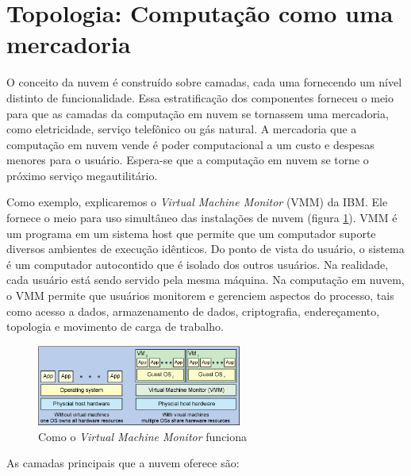 \section{Topologia: Computação como uma mercadoria}

O conceito da nuvem é construído sobre camadas, cada uma fornecendo um nível
distinto de funcionalidade. Essa estratificação dos componentes forneceu o
meio para que as camadas da computação em nuvem se tornassem uma mercadoria, como
eletricidade, serviço telefônico ou gás natural. A mercadoria que a computação em
nuvem vende é poder computacional a um custo e despesas menores para o usuário.
Espera-se que a computação em nuvem se torne o próximo serviço megautilitário.

Como exemplo, explicaremos o \emph{Virtual Machine Monitor} (VMM) da IBM. Ele fornece o meio para
uso simultâneo das instalações de nuvem (figura \ref{fig:vmm}). VMM é um programa em
um sistema host que permite que um computador suporte diversos ambientes de execução
idênticos. Do ponto de vista do usuário, o sistema é um computador autocontido que
é isolado dos outros usuários. Na realidade, cada usuário está sendo servido pela
mesma máquina. Na computação em nuvem, o VMM permite que usuários monitorem e gerenciem
aspectos do processo, tais como acesso a dados, armazenamento de dados, criptografia,
endereçamento, topologia e movimento de carga de trabalho. 


\begin{figure}[ht]
    \centering
    \includegraphics[width=0.6\textwidth]{img/vmm.png}
    \caption{Como o \emph{Virtual Machine Monitor} funciona}
    \label{fig:vmm}
\end{figure}


As camadas principais que a nuvem oferece são:

\newcommand{\itemm}[1]{\item\textbf{#1}}

